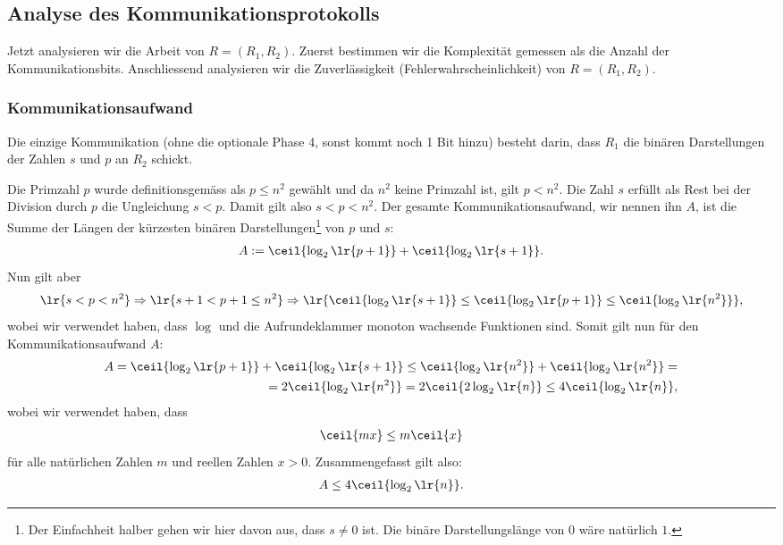 \subsection{Analyse des Kommunikationsprotokolls}
Jetzt analysieren wir die Arbeit von $R = (R_1,R_2)$. Zuerst bestimmen wir die Komplexität gemessen als die Anzahl der Kommunikationsbits. Anschliessend analysieren wir die Zuverlässigkeit (Fehlerwahrscheinlichkeit) von $R = (R_1, R_2)$.
\subsubsection{Kommunikationsaufwand}
Die einzige Kommunikation (ohne die optionale Phase 4, sonst kommt noch 1 Bit hinzu) besteht darin, dass $R_1$ die binären Darstellungen der Zahlen $s$ und $p$ an $R_2$ schickt.

Die Primzahl $p$ wurde definitionsgemäss als $p \leq n^2$ gewählt und da $n^2$ keine Primzahl ist, gilt $p < n^2$. Die Zahl $s$ erfüllt als Rest bei der Division durch $p$ die Ungleichung $s < p$. Damit gilt also $s < p < n^2$. Der gesamte Kommunikationsaufwand, wir nennen ihn $A$, ist die Summe der Längen der kürzesten binären Darstellungen\footnote{Der Einfachheit halber gehen wir hier davon aus, dass $s\neq 0$ ist. Die binäre Darstellungslänge von $0$ wäre natürlich $1$.} von $p$ und $s$:
\begin{align*}
	A := \ceil{\log_2\lr{p + 1}} + \ceil{\log_2\lr{s + 1}}.
\end{align*}
Nun gilt aber
\begin{align*}
	\lr{s < p < n^2} \Rightarrow \lr{s + 1 < p + 1 \leq n^2} \Rightarrow \lr{\ceil{\log_2\lr{s + 1}} \leq \ceil{\log_2\lr{p + 1}} \leq \ceil{\log_2\lr{n^2}}},
\end{align*}
wobei wir verwendet haben, dass $\log$ und die Aufrundeklammer monoton wachsende Funktionen sind. Somit gilt nun für den Kommunikationsaufwand $A$:
\begin{align*}
	A = \ceil{\log_2\lr{p + 1}} + \ceil{\log_2\lr{s + 1}} \leq \ceil{\log_2\lr{n^2}} + \ceil{\log_2\lr{n^2}} = \\
	= 2\ceil{\log_2\lr{n^2}} = 2\ceil{2\log_2\lr{n}} \leq 4\ceil{\log_2\lr{n}},
\end{align*}
wobei wir verwendet haben, dass
\begin{align*}
	\ceil{mx} \leq m\ceil{x}
\end{align*}
für alle natürlichen Zahlen $m$ und reellen Zahlen $x>0$. Zusammengefasst gilt also:
\begin{align*}
	A \leq 4\ceil{\log_2\lr{n}}.
\end{align*}

